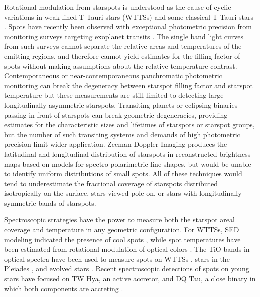 \documentclass[twocolumn]{emulateapj}%
\begin{document}
Rotational modulation from starspots is understood as the cause of cyclic variations in weak-lined T Tauri stars (WTTSs) and some classical T Tauri stars \citep[e.g.][]{vrba86,herbst94}.  Spots have recently been observed with exceptional photometric precision from monitoring surveys targeting exoplanet transits \citep[\emph{e.g}][]{harrison11,davenport15}.  The single band light curves from such surveys cannot separate the relative areas and temperatures of the emitting regions, and therefore cannot yield estimates for the filling factor of spots without making assumptions about the relative temperature contrast. Contemporaneous or near-contemporaneous panchromatic photometric monitoring \citep{herbst94,petrov94,bouvier95,grankin07,cody14} can break the degeneracy between starspot filling factor and starspot temperature but these measurements are still limited to detecting large longitudinally asymmetric starspots.  Transiting planets or eclipsing binaries passing in front of starspots \citep{desert11} can break geometric degeneracies, providing estimates for the characteristic sizes and lifetimes of starspots or starspot groups, but the number of such transiting systems and demands of high photometric precision limit wider application.  Zeeman Doppler Imaging \citep[ZDI]{donati14} produces the latitudinal and longitudinal distribution of starspots in reconstructed brightness maps based on models for spectro-polarimetric line shapes, but would be unable to identify uniform distributions of small spots.  All of these techniques would tend to underestimate the fractional coverage of starspots distributed isotropically on the surface, stars viewed pole-on, or stars with longitudinally symmetric bands of starspots.

Spectroscopic strategies have the power to measure both the starspot areal coverage and temperature in any geometric configuration.  For WTTSs, SED modeling indicated the presence of cool spots \citep{wolk96}, while spot temperatures have been estimated from rotational modulation of optical colors \citep[e.g.][]{grankin98,venuti15,koen16}.  The TiO bands in optical spectra have been used to measure spots on WTTSs \citep{petrov94}, stars in the Pleiades \citep{fang2016}, and evolved stars \citep[e.g.][]{neff95,oneal01,oneal04}.  Recent spectroscopic detections of spots on young stars have focused on TW Hya, an active accretor, and DQ Tau, a close binary in which both components are accreting \citep{debes13,bary14}.  
\end{document}
